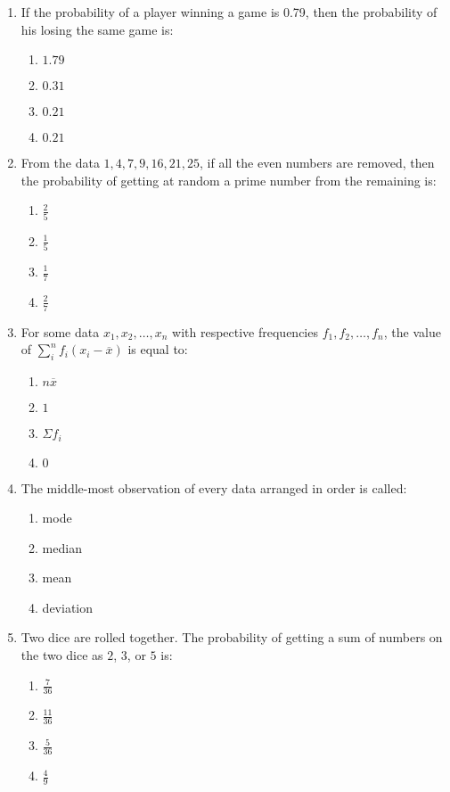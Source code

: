 \documentclass[12pt,-letter paper]{article}
\providecommand{\brak}[1]{\ensuremath{\left(#1\right)}}
\providecommand{\brak}[1]{\ensuremath{\left(#1\right)}}
\begin{document}
\begin{enumerate}

\item If the probability of a player winning a game is 0.79, then the probability of his losing the same game is:
\begin{enumerate}    
    \item $1.79$
    \item $0.31$
    \item $0.21	$                                                           
    \item $0.21$
\end{enumerate}

\item From the data $1, 4, 7, 9, 16, 21, 25$, if all the even numbers are removed, then the probability of getting at random a prime number from the remaining is:
	\begin{enumerate}
\item $\frac{2}{5}$
    \item $\frac{1}{5}$
    \item $\frac{1}{7}$
    \item $\frac{2}{7}$
	\end{enumerate}

\item For some data $x_{1}, x_{2}, \dots, x_{n}$ with respective frequencies $f_{1}, f_{2}, \dots, f_{n}$, the value of $\sum_{i}^{n}f_{i} \brak{x_{i} - \overline{x}}$ is equal to:
	\begin{enumerate}    
\item $n \overline{x}$
    \item $1$
    \item $\Sigma f_{i}$
    \item $0$
	\end{enumerate}

\item The middle-most observation of every data arranged in order is called:
	\begin{enumerate}    
\item mode
    \item median
    \item mean
    \item deviation
\end{enumerate}
\newpage
\item Two dice are rolled together. The probability of getting a sum of numbers on the two dice as $2$, $3$, or $5$ is:
	\begin{enumerate}    
\item $\frac{7}{36}$
    \item $\frac{11}{36}$
    \item $\frac{5}{36}$
    \item $\frac{4}{9}$
	\end{enumerate}
\end{enumerate}
\end{document}
